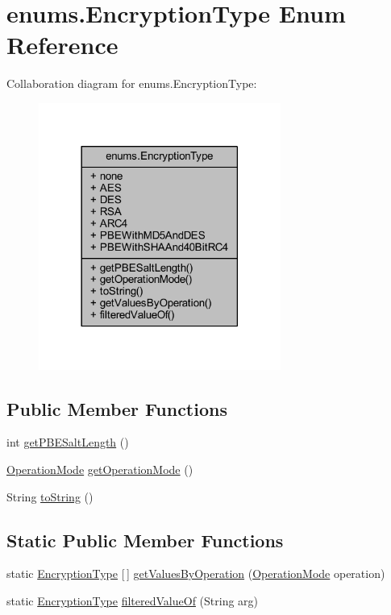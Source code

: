 \hypertarget{enumenums_1_1_encryption_type}{}\section{enums.\+Encryption\+Type Enum Reference}
\label{enumenums_1_1_encryption_type}


Collaboration diagram for enums.\+Encryption\+Type\+:\nopagebreak
\begin{figure}[H]
\begin{center}
\leavevmode
\includegraphics[width=225pt]{enumenums_1_1_encryption_type__coll__graph}
\end{center}
\end{figure}
\subsection*{Public Member Functions}
\begin{DoxyCompactItemize}
\item 
int \mbox{\hyperlink{enumenums_1_1_encryption_type_a1afa9d50b477f0206b5143a7d6b484a4}{get\+P\+B\+E\+Salt\+Length}} ()
\item 
\mbox{\hyperlink{enumenums_1_1_operation_mode}{Operation\+Mode}} \mbox{\hyperlink{enumenums_1_1_encryption_type_a296c258a5b6eee39b475d946ab29757f}{get\+Operation\+Mode}} ()
\item 
String \mbox{\hyperlink{enumenums_1_1_encryption_type_a47a6aef4cb85c8608e6220ee8f4b4d33}{to\+String}} ()
\end{DoxyCompactItemize}
\subsection*{Static Public Member Functions}
\begin{DoxyCompactItemize}
\item 
static \mbox{\hyperlink{enumenums_1_1_encryption_type}{Encryption\+Type}} \mbox{[}$\,$\mbox{]} \mbox{\hyperlink{enumenums_1_1_encryption_type_add4096e0732de7639893f5811f013377}{get\+Values\+By\+Operation}} (\mbox{\hyperlink{enumenums_1_1_operation_mode}{Operation\+Mode}} operation)
\item 
static \mbox{\hyperlink{enumenums_1_1_encryption_type}{Encryption\+Type}} \mbox{\hyperlink{enumenums_1_1_encryption_type_aea9576b120c7941c9e2e96ee6e0d2db7}{filtered\+Value\+Of}} (String arg)
\end{DoxyCompactItemize}
